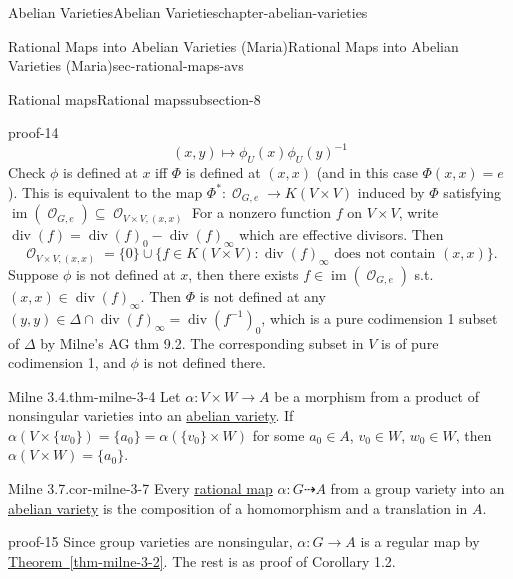 \documentclass[oneside,10pt,]{book}
\numberwithin{equation}{section}
\newcommand{\sheaf}[1]{\operatorname{\mathcal{#1}}}
\DeclareMathOperator{\divisor}{div}
\DeclareMathOperator{\im}{im}
\begin{document}
\begin{chapterptx}{Abelian Varieties}{}{Abelian Varieties}{}{}{chapter-abelian-varieties}
\begin{sectionptx}{Rational Maps into Abelian Varieties (Maria)}{}{Rational Maps into Abelian Varieties (Maria)}{}{}{sec-rational-maps-avs}
\begin{subsectionptx}{Rational maps}{}{Rational maps}{}{}{subsection-8}
\begin{proofptx}{}{proof-14}
\begin{equation*}
\end{equation*}
%
\begin{equation*}
(x,y) \mapsto \phi_U(x) \phi_U(y)^{-1}
\end{equation*}
Check \(\phi\) is defined at \(x\) iff \(\Phi\) is defined at \((x,x)\) (and in this case \(\Phi(x,x) = e\)). This is equivalent to the map \(\Phi^*\colon \sheaf O_{G,e} \to K(V\times V)\) induced by  \(\Phi\) satisfying   \(\im(\sheaf O_{G,e}) \subseteq \sheaf O_{V\times V, (x,x)}\) For a nonzero function \(f\) on \(V\times V\), write \(\divisor(f) = \divisor(f)_0 - \divisor(f)_\infty\) which are effective divisors. Then%
\begin{equation*}
\sheaf O_{V\times V, (x,x)} = \{0\} \cup \{f\in K(V\times V) : \divisor(f)_\infty \text{ does not contain }(x,x)\}\text{.}
\end{equation*}
Suppose \(\phi\) is not defined at \(x\), then there exists \(f\in \im(\sheaf O_{G,e})\) s.t. \((x,x) \in \divisor(f)_\infty\). Then \(\Phi\) is not defined at any \((y,y) \in \Delta \cap  \divisor(f)_\infty = \divisor(f^{-1})_0\), which is a pure codimension 1 subset of \(\Delta\) by Milne's AG thm 9.2. The corresponding subset in \(V\) is of pure codimension 1, and \(\phi\) is not defined there.%
\end{proofptx}
\begin{theorem}{Milne 3.4.}{}{thm-milne-3-4}%
\hypertarget{p-93}{}%
Let \(\alpha \colon V \times W \to A\) be a morphism from a product of nonsingular varieties into an \hyperref[def-buntes-abvar]{abelian variety}. If \(\alpha (V\times\{w_0\}) = \{a_0 \} =  \alpha(\{v_0 \}\times W)\) for some \(a_0 \in A\), \(v_0\in W\), \(w_0 \in W\), then \(\alpha(V\times W) = \{a_0\}\).%
\end{theorem}
\begin{corollary}{Milne 3.7.}{}{cor-milne-3-7}%
\hypertarget{p-94}{}%
Every \hyperref[def-rational-map]{rational map} \(\alpha \colon G\dashrightarrow A\) from a group variety into an \hyperref[def-buntes-abvar]{abelian variety} is the composition of a homomorphism and a translation in \(A\).%
\end{corollary}
\begin{proofptx}{}{proof-15}
\hypertarget{p-95}{}%
Since group varieties are nonsingular, \(\alpha\colon G \to A\) is a regular map by \hyperref[thm-milne-3-2]{Theorem~\ref{thm-milne-3-2}}. The rest is as proof of Corollary 1.2.%
\end{proofptx}
\end{subsectionptx}
%
%
\typeout{************************************************}

\end{sectionptx}
\end{chapterptx}
\end{document}

